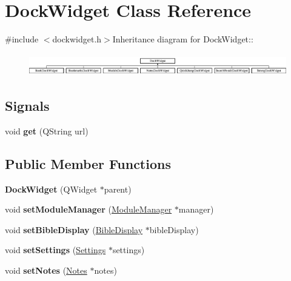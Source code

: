 \hypertarget{classDockWidget}{
\section{DockWidget Class Reference}
\label{classDockWidget}
}


{\ttfamily \#include $<$dockwidget.h$>$}Inheritance diagram for DockWidget::\begin{figure}[H]
\begin{center}
\leavevmode
\includegraphics[height=0.987654cm]{classDockWidget}
\end{center}
\end{figure}
\subsection*{Signals}
\begin{DoxyCompactItemize}
\item 
\hypertarget{classDockWidget_a9fd17bf8594158048b595c12261a9f0c}{
void {\bfseries get} (QString url)}
\label{classDockWidget_a9fd17bf8594158048b595c12261a9f0c}

\end{DoxyCompactItemize}
\subsection*{Public Member Functions}
\begin{DoxyCompactItemize}
\item 
\hypertarget{classDockWidget_a85036ae61d7594bbf319bef16cd80d35}{
{\bfseries DockWidget} (QWidget $\ast$parent)}
\label{classDockWidget_a85036ae61d7594bbf319bef16cd80d35}

\item 
\hypertarget{classDockWidget_a9d86e039e3ddfd2629e31edfbed75e79}{
void {\bfseries setModuleManager} (\hyperlink{classModuleManager}{ModuleManager} $\ast$manager)}
\label{classDockWidget_a9d86e039e3ddfd2629e31edfbed75e79}

\item 
\hypertarget{classDockWidget_ae7e6cce8f18a0b1304a6effd193fc784}{
void {\bfseries setBibleDisplay} (\hyperlink{classBibleDisplay}{BibleDisplay} $\ast$bibleDisplay)}
\label{classDockWidget_ae7e6cce8f18a0b1304a6effd193fc784}

\item 
\hypertarget{classDockWidget_ad7790095b6ea0e097870c3cc51729b14}{
void {\bfseries setSettings} (\hyperlink{classSettings}{Settings} $\ast$settings)}
\label{classDockWidget_ad7790095b6ea0e097870c3cc51729b14}

\item 
\hypertarget{classDockWidget_a5e309057de91086fc4af4c3f3f9c138f}{
void {\bfseries setNotes} (\hyperlink{classNotes}{Notes} $\ast$notes)}
\label{classDockWidget_a5e309057de91086fc4af4c3f3f9c138f}

\end{DoxyCompactItemize}

